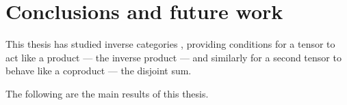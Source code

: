 \chapter{Conclusions and future work} %
\label{cha:conclusions_and_future_work}

This thesis has studied inverse categories \cite{cockett2002:restcategories1}, providing conditions
for a tensor to act like a product --- the inverse product --- and similarly for a second
tensor to behave like a coproduct --- the disjoint sum.

The following are the main results of this thesis.



